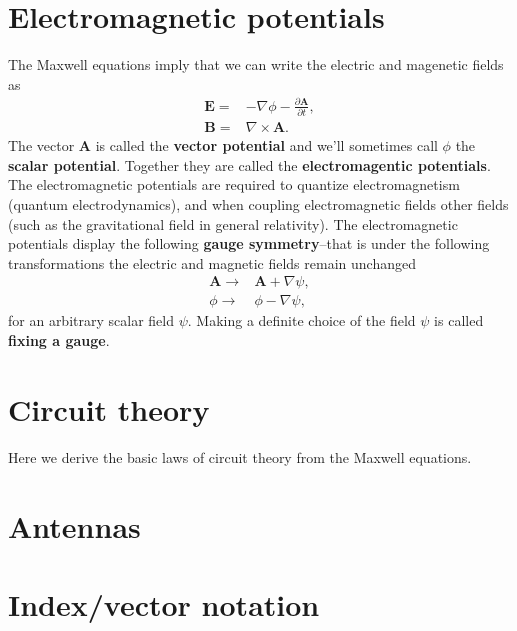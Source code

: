 \documentclass[12pt]{report}
\newcommand{\bA}{{\bm A}}
\newcommand{\bB}{{\bm B}}
\newcommand{\bE}{{\bm E}}
\begin{document}
\chapter{Electromagnetic potentials}

The Maxwell equations imply that we can write the electric and magenetic fields as
\begin{align}
    \bE
    =&
    -
    \nabla\phi
    -
    \frac{\partial\bA}{\partial t}
    ,\\
    \bB
    =&
    \nabla\times\bA
    .
\end{align}
The vector $\bA$ is called the \textbf{vector potential} and we'll sometimes call $\phi$ the \textbf{scalar potential}. 
Together they are called the \textbf{electromagentic potentials}.
The electromagnetic potentials are required to quantize electromagnetism (quantum electrodynamics), and when coupling electromagnetic fields other fields (such as the gravitational field in general relativity).
The electromagnetic potentials display the following \textbf{gauge symmetry}--that is under the following transformations the electric and magnetic fields remain unchanged
\begin{align}
    \bA
    \to&
    \bA
    +
    \nabla\psi
    ,\\
    \phi
    \to&
    \phi
    -
    \nabla\psi
    ,
\end{align}
for an arbitrary scalar field $\psi$.
Making a definite choice of the field $\psi$ is called \textbf{fixing a gauge}.

\chapter{Circuit theory}

Here we derive the basic laws of circuit theory from the Maxwell equations.

\chapter{Antennas}

\appendix
\chapter{Index/vector notation}
\end{document}
